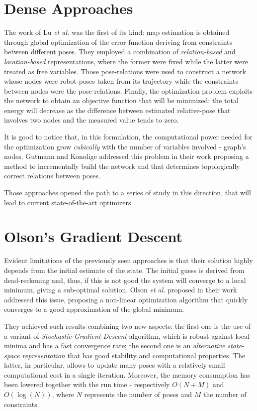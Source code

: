 \section{Dense Approaches}\label{sec:dense_approaches}
The work of Lu \textit{et al.} \cite{lu1997globally} was the first of its kind: map estimation is obtained through global optimization of the error function deriving from constraints between different poses. They employed a combination of \textit{relation-based} and \textit{location-based} representations, where the former were fixed while the latter were treated as free variables. Those pose-relations were used to construct a network whose nodes were robot poses taken from its trajectory while the constraints between nodes were the pose-relations. Finally, the optimization problem exploits the network to obtain an objective function that will be minimized: the total energy will decrease as the difference between estimated relative-pose that involves two nodes and the measured value tends to zero. 

It is good to notice that, in this formulation, the computational power needed for the optimization grow \textit{cubically} with the number of variables involved - graph's nodes. Gutmann and Konolige addressed this problem in their work \cite{gutmann1999incremental} proposing a method to incrementally build the network and that determines topologically correct relations between poses.

Those approaches opened the path to a series of study in this direction, that will lead to current state-of-the-art optimizers.

\section{Olson's Gradient Descent}\label{sec:olson}
Evident limitations of the previously seen approaches is that their solution highly depends from the initial estimate of the state. The initial guess is derived from dead-reckoning and, thus, if this is not good the system will converge to a local minimum, giving a sub-optimal solution. Olson \textit{et al.} proposed in their work \cite{olson2006fast} addressed this issue, proposing a non-linear optimization algorithm that quickly converges to a good approximation of the global minimum. 

They achieved such results combining two new aspects: the first one is the use of a variant of \textit{Stochastic Gradient Descent} algorithm, which is robust against local minima and has a fast convergence rate; the second one is an \textit{alternative state-space representation} that has good stability and computational properties. The latter, in particular, allows to update many poses with a relatively small computational cost in a single iteration. Moreover, the memory consumption has been lowered together with the run time - respectively $O(N + M)$ and $O(\log(N))$, where $N$ represents the number of poses and $M$ the number of constraints.

